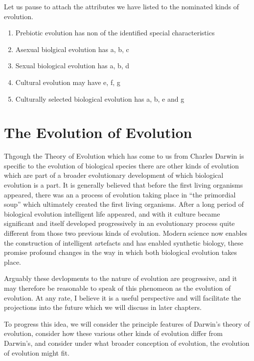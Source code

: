 { Let us pause to attach the attributes we have listed to the nominated kinds of evolution.

 \renewcommand{\theenumi}{\Alph{enumi}}

\begin{enumerate}
\item Prebiotic evolution has non of the identified special characteristics
\item Asexual biolgical evolution has a, b, c
\item Sexual biological evolution has a, b, d
\item Cultural evolution may have e, f, g 
\item Culturally selected biological evolution has a, b, e and g
\end{enumerate}

\chapter{The Evolution of Evolution}\label{EvolutionOfEvolution}

Thgough the Theory of Evolution which has come to us from Charles Darwin is specific to the evolution of biological species there are other kinds of evolution which are part of a broader evolutionary development of which biological evolution is a part.
It is generally believed that before the first living organisms appeared, there was an a process of evolution taking place in ``the primordial soup'' which ultimately created the first living organisms.
After a long period of biological evolution intelligent life appeared, and with it culture became significant and itself developed progressively in an evolutionary process quite different from those two previous kinds of evolution.
Modern science now enables the construction of intelligent artefacts and has enabled synthetic biology, these promise profound changes in the way in which both biological evolution takes place.

Arguably these devlopments to the nature of evolution are progressive, and it may therefore be reasonable to speak of this phenomeon as the evolution of evolution.
At any rate, I believe it is a useful perspective and will facilitate the projections into the future which we will discuss in later chapters.

To progress this idea, we will consider the principle features of Darwin's theory of evolution, consider how these various other kinds of evolution differ from Darwin's, and consider under what broader conception of evolution, the evolution of evolution might fit.

}

